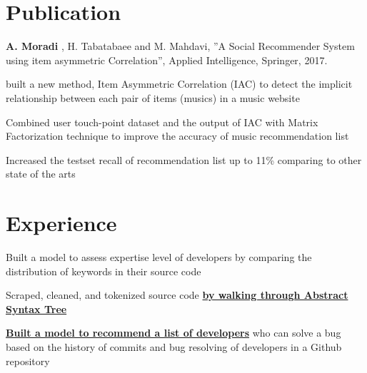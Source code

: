 \documentclass[letterpaper]{deedy-resume} %
\begin{document}
\hfill
%
%
\begin{minipage}[t]{0.66\textwidth} %

\section{Publication}

\textbf{A. Moradi} , H. Tabatabaee and M. Mahdavi, ''A Social Recommender System
using item asymmetric Correlation'', Applied Intelligence, Springer, 2017.\\
\begin{tightitemize}
\item built a new method, Item Asymmetric Correlation (IAC) to detect the implicit relationship between each pair of items (musics) in a music website
\item Combined user touch-point dataset and the output of IAC with Matrix Factorization technique to improve the accuracy of music recommendation list
\item Increased the testset recall of recommendation list up to 11\%  comparing to other state of the arts 
\end{tightitemize}
\section{Experience}


\vspace{\topsep} %
\begin{tightitemize}
\item Built a model to assess expertise level of developers by comparing the distribution of keywords in their source code
\item Scraped, cleaned, and tokenized source code \href{https://medium.com/@moradi.arghavan/lexical-analysis-of-source-codes-with-walking-through-abstract-syntax-tree-ast-14594fb0f84b}{\bf by walking through Abstract Syntax Tree}
\item \href{https://github.com/arghavanmo/RS-Final-Project}{\bf Built a model to recommend a list of developers} who can solve a bug based on the history of commits and bug resolving of developers in a Github repository
\end{tightitemize}


\end{minipage}
\end{document}
